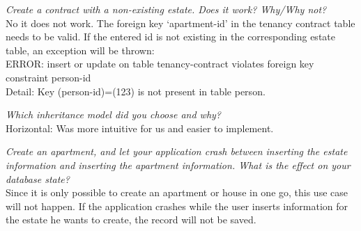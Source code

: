 \documentclass[ngerman]{dis-template-add}
\begin{document}
\textit{Create a contract with a non-existing estate. Does it work? Why/Why not?
} \\
No it does not work. The foreign key `apartment-id' in the tenancy contract table needs to be valid. If the entered id is not existing in the corresponding estate table, an exception will be thrown: \\
ERROR: insert or update on table tenancy-contract violates foreign key constraint person-id \\
Detail: Key (person-id)=(123) is not present in table person.

\textit{Which inheritance model did you choose and why?
} \\
Horizontal: Was more intuitive for us and easier to implement.

\textit{Create an apartment, and let your application crash between inserting the estate information and inserting the apartment information. What is the effect on your database state?
} \\
Since it is only possible to create an apartment or house in one go, this use case will not happen.
If the application crashes while the user inserts information for the estate he wants to create, the record will not be saved.
\end{document}
